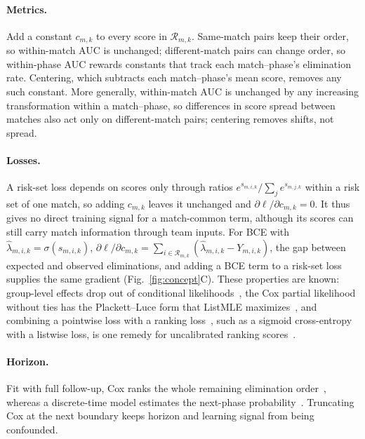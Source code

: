 \documentclass[sigconf,anonymous]{acmart}
\begin{document}
\paragraph{Metrics.}
Add a constant $c_{m,k}$ to every score in $\mathcal{R}_{m,k}$. Same-match pairs keep their order, so within-match AUC is unchanged; different-match pairs can change order, so within-phase AUC rewards constants that track each match--phase's elimination rate. Centering, which subtracts each match--phase's mean score, removes any such constant. More generally, within-match AUC is unchanged by any increasing transformation within a match--phase, so differences in score spread between matches also act only on different-match pairs; centering removes shifts, not spread.

\paragraph{Losses.}
A risk-set loss depends on scores only through ratios $e^{s_{m,i,k}}/\sum_{j}e^{s_{m,j,k}}$ within a risk set of one match, so adding $c_{m,k}$ leaves it unchanged and $\partial\ell/\partial c_{m,k}=0$. It thus gives no direct training signal for a match-common term, although its scores can still carry match information through team inputs. For BCE with $\hat\lambda_{m,i,k}=\sigma(s_{m,i,k})$, $\partial\ell/\partial c_{m,k}=\sum_{i\in\mathcal{R}_{m,k}}(\hat\lambda_{m,i,k}-Y_{m,i,k})$, the gap between expected and observed eliminations, and adding a BCE term to a risk-set loss supplies the same gradient (Fig.~\ref{fig:concept}C). These properties are known: group-level effects drop out of conditional likelihoods~\cite{Chamberlain80}, the Cox partial likelihood without ties has the Plackett--Luce form that ListMLE maximizes~\cite{Xia08}, and combining a pointwise loss with a ranking loss~\cite{Sculley10}, such as a sigmoid cross-entropy with a listwise loss, is one remedy for uncalibrated ranking scores~\cite{Bai23}.

\paragraph{Horizon.}
Fit with full follow-up, Cox ranks the whole remaining elimination order~\cite{Cox72}, whereas a discrete-time model estimates the next-phase probability~\cite{SingerWillett93,Gensheimer19}. Truncating Cox at the next boundary keeps horizon and learning signal from being confounded.
\end{document}
